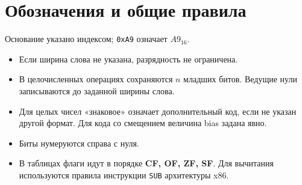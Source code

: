 \section{Обозначения и общие правила}
Основание указано индексом; \texttt{0xA9} означает $A9_{16}$.

\begin{itemize}
    \item Если ширина слова не указана, разрядность не ограничена.
    \item В целочисленных операциях сохраняются $n$ младших битов. Ведущие нули записываются до заданной ширины слова.
    \item Для целых чисел «знаковое» означает дополнительный код, если не указан другой формат. Для кода со смещением величина bias задана явно.
    \item Биты нумеруются справа с нуля.
    \item В таблицах флаги идут в порядке \textbf{CF, OF, ZF, SF}. Для вычитания используются правила инструкции \texttt{SUB} архитектуры x86.
\end{itemize}

\tableofcontents
